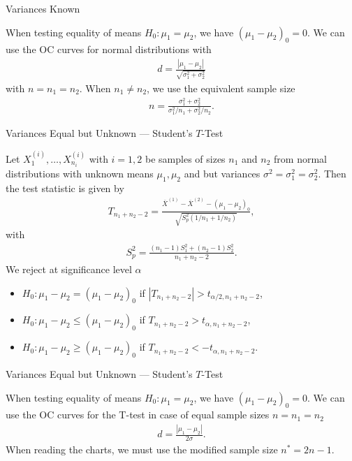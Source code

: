 \begin{frame}{Variances Known}

\justifying
{} When testing equality of means $H_0: \mu_1 = \mu_2$, we have $(\mu_1-\mu_2)_0 = 0$. We can use the OC curves for normal distributions with
\begin{align*}
d = \frac{|\mu_1-\mu_2|}{\sqrt{\sigma_1^2+\sigma_2^2}}
\end{align*}
with $n = n_1 = n_2$. When $n_1\neq n_2$, we use the equivalent sample size
\begin{align*}
n = \frac{\sigma_1^2 + \sigma_2^2}{\sigma_1^2/n_1 + \sigma_2^2/n_2}.
\end{align*}

\end{frame}

\begin{frame}{Variances Equal but Unknown --- Student's $T$-Test}

\justifying
{} Let $X_1^{(i)}, \ldots, X_{n_i}^{(i)}$ with $i = 1, 2$ be samples of sizes $n_1$ and $n_2$ from normal distributions with unknown means $\mu_1, \mu_2$ and  but  variances $\sigma^2 = \sigma_1^2 = \sigma_2^2$. Then the test statistic is given by
\footnotesize
\begin{align*}
T_{n_1+n_2-2} = \frac{\overline{X}^{(1)} - \overline{X}^{(2)} - (\mu_1-\mu_2)_0}{\sqrt{S_p^2(1/n_1+1/n_2)}},
\end{align*}
\normalsize
with 
\footnotesize
\begin{align*}
S_p^2 = \frac{(n_1-1)S_1^2 + (n_2-1)S_2^2}{n_1+n_2-2}.
\end{align*}
\normalsize
We reject at significance level $\alpha$
\begin{itemize}
	\item $H_0: \mu_1 - \mu_2 = (\mu_1-\mu_2)_0$ if $|T_{n_1+n_2-2}| > t_{\alpha/2, n_1+n_2-2}$,
	\item $H_0: \mu_1 - \mu_2 \leq (\mu_1-\mu_2)_0$ if $T_{n_1+n_2-2} > t_{\alpha,n_1+n_2-2}$,
	\item $H_0: \mu_1 - \mu_2 \geq (\mu_1-\mu_2)_0$ if $T_{n_1+n_2-2} < -t_{\alpha,n_1+n_2-2}$.
\end{itemize}

\end{frame}


\begin{frame}{Variances Equal but Unknown --- Student's $T$-Test}

\justifying
{} When testing equality of means $H_0: \mu_1 = \mu_2$, we have $(\mu_1-\mu_2)_0 = 0$. We can use the OC curves for the T-test in case of equal sample sizes $n = n_1 = n_2$
\begin{align*}
d = \frac{|\mu_1-\mu_2|}{2\sigma}.
\end{align*}
When reading the charts, we must use the modified sample size $n^* = 2n-1$.

\end{frame}


